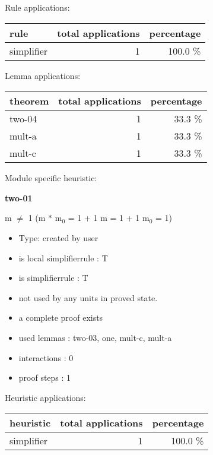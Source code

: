 \documentclass[a4paper]{article}
\begin{document}
Rule applications:

\begin{supertabular}{l|r|r}
rule	        & total applications & percentage \\ \hline
simplifier & 1 & 100.0 \% \\

\end{supertabular}

Lemma applications:

\begin{supertabular}{l|r|r}
theorem	        & total applications & percentage \\ \hline
two-04 & 1 & 33.3 \% \\
mult-a & 1 & 33.3 \% \\
mult-c & 1 & 33.3 \% \\

\end{supertabular}

Module specific heuristic:

\pagebreak

{\LARGE\bf two-01}\label{lemma-two-01}

\medskip

 \Fol m $\neq$ 1 \Imp (m $*$ $\mbox{m}_{0}$ = 1 + 1 \Equiv m = 1 + 1 \And $\mbox{m}_{0}$ = 1)

\begin{itemize}

\item Type: created by user

\item is local simplifierrule : T
\item is simplifierrule : T
\item not used by any units in proved state.
\item       a complete proof exists
\item       used lemmas  : two-03, one, mult-c, mult-a
\item       interactions : 0
\item       proof steps  : 1
\end{itemize}

\medskip


Heuristic applications:

\begin{supertabular}{l|r|r}
heuristic	& total applications & percentage \\ \hline
simplifier & 1 & 100.0 \% \\

\end{supertabular}
\end{document}
